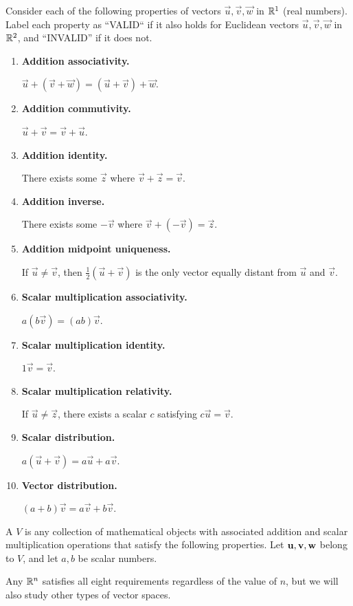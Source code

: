 \begin{applicationActivities}
\begin{activity}{20}\smallSlideText
Consider each of the following properties of vectors \(\vec u,\vec v, \vec w\)
in \(\mathbb{R}^1\) (real numbers). Label each property
as ``VALID`` if it also holds for Euclidean vectors \(\vec u,\vec v, \vec w\)
in \(\mathbb{R}^2\), and ``INVALID'' if it does not.
\begin{multicols}{2}
\begin{enumerate}
  \item \textbf{Addition associativity.}

        \(\vec u+(\vec v+\vec w)=
        (\vec u+\vec v)+\vec w\).
  \item \textbf{Addition commutivity.}

        \(\vec u+\vec v=
        \vec v+\vec u\).
  \item \textbf{Addition identity.}

        There exists some \(\vec z\)
        where \(\vec v+\vec z=\vec v\).
  \item \textbf{Addition inverse.}

        There exists some \(-\vec v\)
        where \(\vec v+(-\vec v)=\vec z\).
  \item \textbf{Addition midpoint uniqueness.}

        If \(\vec u\not=\vec v\), then
        \(\frac{1}{2}(\vec u+\vec v)\) is the only vector
        equally distant from \(\vec u\) and \(\vec v\).
  \item \textbf{Scalar multiplication associativity.}

        \(a(b\vec v)=(ab)\vec v\).
  \item \textbf{Scalar multiplication identity.}

        \(1\vec v=\vec v\).
  \item \textbf{Scalar multiplication relativity.}

        If \(\vec u\not=\vec z\), there exists a scalar \(c\)
        satisfying \(c\vec u=\vec v\).
  \item \textbf{Scalar distribution.}

        \(a(\vec u+\vec v)=a\vec u+a\vec v\).
  \item \textbf{Vector distribution.}

        \((a+b)\vec v=a\vec v+b\vec v\).
\end{enumerate}
\end{multicols}
\end{activity}

\begin{definition}
  A  \(V\) is any collection of mathematical objects with
  associated addition and scalar multiplication operations that satisfy
  the following properties. Let \(\mathbf u,\mathbf v,\mathbf w\) belong to \(V\),
  and let \(a,b\) be scalar numbers.

  \vectorSpaceProperties

  Any  \(\mathbb{R}^n\) satisfies all eight
  requirements regardless of the value of \(n\),
  but we will also study other types of vector spaces.
\end{definition}


\end{applicationActivities}
